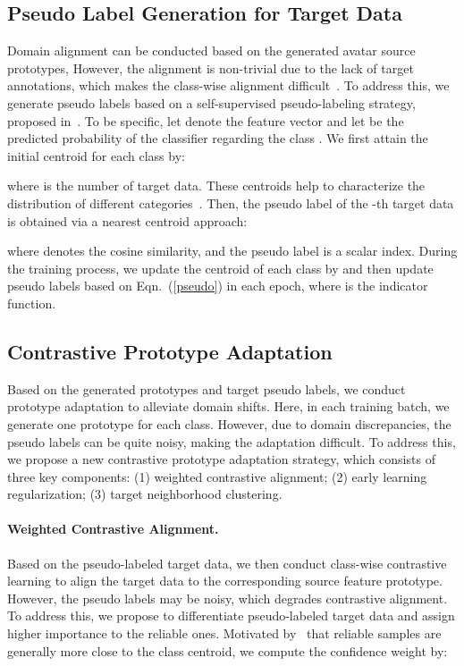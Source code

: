 \documentclass{article}
\begin{document}
\subsection{Pseudo Label Generation for Target Data}
\label{sec:pse}
Domain alignment can be conducted based on the generated avatar source prototypes, However, the alignment is non-trivial due to the lack of target annotations, which makes the class-wise alignment  difficult~\cite{pei2018multi,Kang2019ContrastiveAN}. To address this, we generate pseudo labels based on a self-supervised pseudo-labeling strategy, proposed in~\cite{liang2020shot}. To be specific, let  denote  the feature vector and let  be the predicted probability of the classifier regarding the class . We first attain the initial centroid for each class  by:

where  is the number of target data. These centroids help to characterize  the distribution of different categories~\cite{liang2020shot}. Then, the pseudo label  of the -th target data is obtained via a nearest centroid approach:

where  denotes the cosine similarity, and the pseudo label   is a scalar index. 
During the training process, we update the centroid of each class by 
 and then update  pseudo labels based on Eqn.~(\ref{pseudo})  in  each   epoch,
where  is the indicator function. 


\subsection{Contrastive Prototype Adaptation}\label{stage2} 
Based on the generated prototypes and target pseudo labels, we conduct prototype adaptation to alleviate domain shifts. Here, in each training batch, we generate one prototype for each class. 
However, due to domain discrepancies, the pseudo labels can be quite noisy, making the adaptation difficult. 
To address this, we propose a new contrastive prototype adaptation strategy, which consists of three key components: (1) weighted contrastive alignment; (2) early learning regularization; (3) target neighborhood clustering. 







\paragraph{Weighted Contrastive Alignment.} 
Based on the pseudo-labeled target data, we then conduct class-wise contrastive learning to align the target data to the corresponding source feature prototype.
However, the  pseudo labels may be noisy, which degrades contrastive alignment. To address this, we propose to differentiate pseudo-labeled target data and assign higher importance to the reliable ones. Motivated by~\cite{Chen2019ProgressiveFA} that reliable samples are generally more close to the class centroid, we compute the confidence weight by:
  
\end{document}
